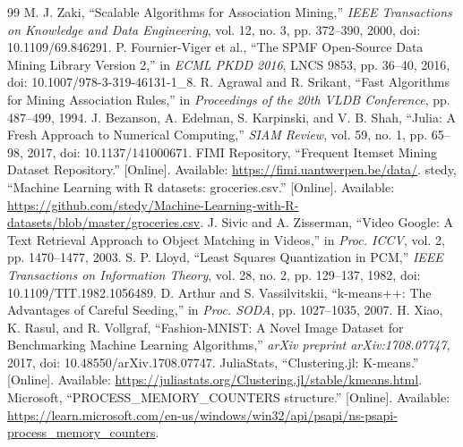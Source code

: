 \begin{thebibliography}{99}
 M. J. Zaki, ``Scalable Algorithms for Association Mining,''
\emph{IEEE Transactions on Knowledge and Data Engineering}, vol. 12, no. 3,
pp. 372--390, 2000, doi: 10.1109/69.846291.
 P. Fournier-Viger et al., ``The SPMF Open-Source Data Mining
Library Version 2,'' in \emph{ECML PKDD 2016}, LNCS 9853, pp. 36--40, 2016,
doi: 10.1007/978-3-319-46131-1\_8.
 R. Agrawal and R. Srikant, ``Fast Algorithms for Mining
Association Rules,'' in \emph{Proceedings of the 20th VLDB Conference},
pp. 487--499, 1994.
 J. Bezanson, A. Edelman, S. Karpinski, and V. B. Shah,
``Julia: A Fresh Approach to Numerical Computing,'' \emph{SIAM Review},
vol. 59, no. 1, pp. 65--98, 2017, doi: 10.1137/141000671.
 FIMI Repository, ``Frequent Itemset Mining Dataset Repository.''
[Online]. Available: \url{https://fimi.uantwerpen.be/data/}.
 stedy, ``Machine Learning with R datasets: groceries.csv.''
[Online]. Available: \url{https://github.com/stedy/Machine-Learning-with-R-datasets/blob/master/groceries.csv}.
 J. Sivic and A. Zisserman, ``Video Google: A Text Retrieval
Approach to Object Matching in Videos,'' in \emph{Proc. ICCV}, vol. 2,
pp. 1470--1477, 2003.
 S. P. Lloyd, ``Least Squares Quantization in PCM,''
\emph{IEEE Transactions on Information Theory}, vol. 28, no. 2,
pp. 129--137, 1982, doi: 10.1109/TIT.1982.1056489.
 D. Arthur and S. Vassilvitskii, ``k-means++: The Advantages of
Careful Seeding,'' in \emph{Proc. SODA}, pp. 1027--1035, 2007.
 H. Xiao, K. Rasul, and R. Vollgraf, ``Fashion-MNIST: A
Novel Image Dataset for Benchmarking Machine Learning Algorithms,''
\emph{arXiv preprint arXiv:1708.07747}, 2017,
doi: 10.48550/arXiv.1708.07747.
 JuliaStats, ``Clustering.jl: K-means.'' [Online].
Available: \url{https://juliastats.org/Clustering.jl/stable/kmeans.html}.
 Microsoft, ``PROCESS\_MEMORY\_COUNTERS structure.''
[Online]. Available: \url{https://learn.microsoft.com/en-us/windows/win32/api/psapi/ns-psapi-process_memory_counters}.
\end{thebibliography}
